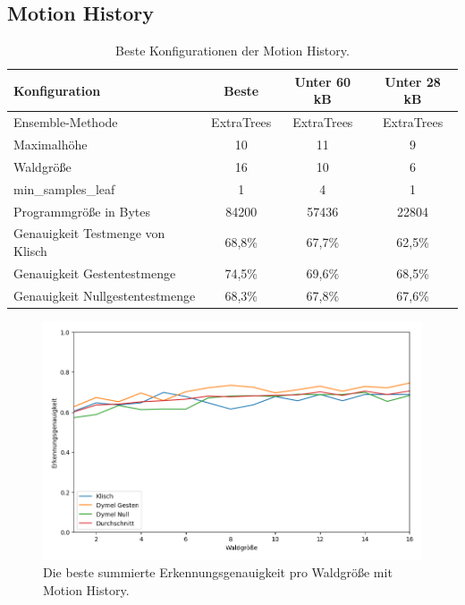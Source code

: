 \subsection{Motion History}
\begin{table}[h!]
    \centering
    \begin{tabular}{ | l | c | c | c |}
        \hline
        Konfiguration & Beste & Unter 60 kB & Unter 28 kB \\\hline
        Ensemble-Methode & ExtraTrees & ExtraTrees & ExtraTrees \\\hline
        Maximalhöhe & 10 & 11 & 9 \\\hline
        Waldgröße & 16 & 10 & 6 \\\hline
        min\_samples\_leaf & 1 & 4 & 1 \\\hline
        Programmgröße in Bytes & 84200 & 57436 & 22804 \\\hline
        Genauigkeit Testmenge von Klisch & 68,8\% & 67,7\% & 62,5\% \\\hline
        Genauigkeit Gestentestmenge & 74,5\% & 69,6\% & 68,5\% \\\hline
        Genauigkeit Nullgestentestmenge & 68,3\% & 67,8\% & 67,6\% \\\hline
    \end{tabular}
    \caption{Beste Konfigurationen der Motion History.}
    \label{tab:motion_history}
\end{table}
\begin{figure}[h!]
    \centering
    \includegraphics[width=\linewidth]{images/motion_history_acc_per_size.png}
    \caption{Die beste summierte Erkennungsgenauigkeit pro Waldgröße mit Motion History.}
    \label{fig:motion_history_per_forest_size}
\end{figure}
